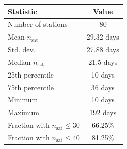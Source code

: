 \begin{tabular}{lc}
\toprule
\textbf{Statistic} & \textbf{Value} \\
\midrule
Number of stations & 80 \\
Mean $n_{\mathrm{sat}}$ & 29.32 days \\
Std. dev. & 27.88 days \\
Median $n_{\mathrm{sat}}$ & 21.5 days \\
25th percentile & 10 days \\
75th percentile & 36 days \\
Minimum & 10 days \\
Maximum & 192 days \\
Fraction with $n_{\mathrm{sat}} \leq 30$ & 66.25\% \\
Fraction with $n_{\mathrm{sat}} \leq 40$ & 81.25\% \\
\bottomrule
\end{tabular}
